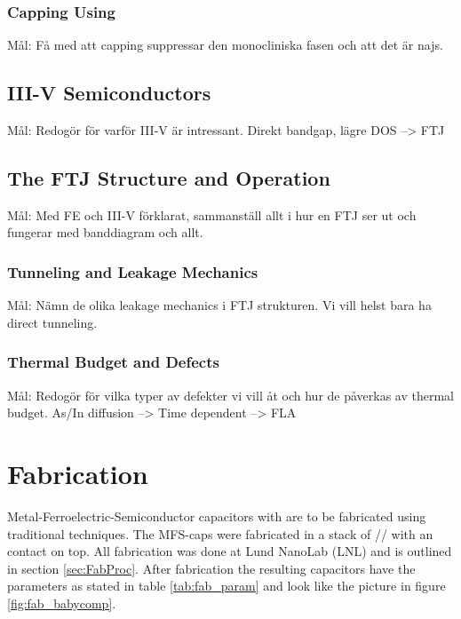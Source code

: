 \documentclass[11pt,twoside]{eitExjobb}
\begin{document}
\subsection{Capping Using }

Mål: Få med att capping suppressar den monocliniska fasen och att det är najs.

\section{III-V Semiconductors}

Mål: Redogör för varför III-V är intressant. Direkt bandgap, lägre DOS --> FTJ

\section{The FTJ Structure and Operation}

Mål: Med FE och III-V förklarat, sammanställ allt i hur en FTJ ser ut och
fungerar med banddiagram och allt.

\subsection{Tunneling and Leakage Mechanics}

Mål: Nämn de olika leakage mechanics i FTJ strukturen. Vi vill helst bara ha
direct tunneling.

\subsection{Thermal Budget and Defects}

Mål: Redogör för vilka typer av defekter vi vill åt och hur de påverkas av
thermal budget. As/In diffusion --> Time dependent --> FLA

\chapter{Fabrication}\label{ch:fab}

Metal-Ferroelectric-Semiconductor capacitors with are to be fabricated using
traditional techniques. The MFS-caps were fabricated in a stack of
// with an  contact on top. All fabrication was
done at Lund NanoLab (LNL) and is outlined in section \ref{sec:FabProc}. After
fabrication the resulting capacitors have the parameters as stated in table
\ref{tab:fab_param} and look like the picture in figure \ref{fig:fab_babycomp}.
\end{document}
